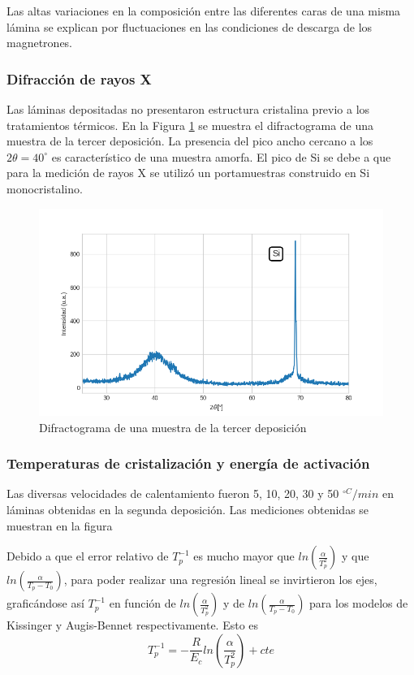 \documentclass[12pt]{article}
\theoremstyle{definition}
\theoremstyle{remark}
\begin{document}
{Las altas variaciones en la composición entre las diferentes caras de una misma lámina se explican por fluctuaciones en las condiciones de descarga de los magnetrones. 

\subsubsection{Difracción de rayos X}
Las láminas depositadas no presentaron estructura cristalina previo a los tratamientos térmicos. En la Figura \ref{amorfo} se muestra el difractograma de una muestra de la tercer deposición. La presencia del pico ancho cercano a los $2\theta=40^\circ$  es característico de una muestra amorfa. El pico de Si se debe a que para la medición de rayos X se utilizó un portamuestras construido en Si monocristalino.

\begin{figure}[H]
 	\centering
	\includegraphics[scale=0.6]{img/RX_amorfo.png}
 	\caption{Difractograma de una muestra de la tercer deposición}
	\label{amorfo}
\end{figure}


\subsubsection{Temperaturas de cristalización y energía de activación}

Las diversas velocidades de calentamiento fueron 5, 10, 20, 30 y 50 $^{\circ C }/min$ en láminas obtenidas en la segunda deposición. Las mediciones obtenidas se muestran en la figura 

Debido a que el error relativo de $T_p^{-1}$ es mucho mayor que $ln(\frac{\alpha}{T_p^2})$ y que $ln(\frac{\alpha}{T_p-T_0})$, para poder realizar una regresión lineal se invirtieron los ejes, graficándose así $T_p^{-1}$ en función de $ln(\frac{\alpha}{T_p^2})$ y de $ln(\frac{\alpha}{T_p-T_0})$ para los modelos de Kissinger y Augis-Bennet respectivamente. Esto es
\begin{equation}
	T_p^{-1}=-\frac{R}{E_c}ln(\frac{\alpha}{T_p^2})+cte
\end{equation}

}
\end{document}
